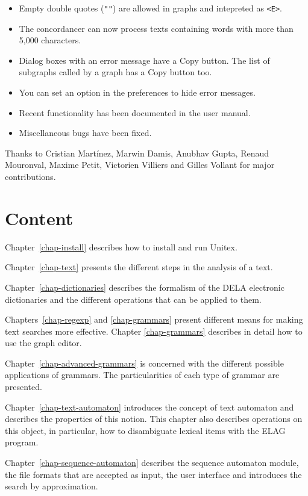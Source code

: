 \begin{itemize}
  \item Empty double quotes (\verb$""$) are allowed in graphs and intepreted
  as \verb$<E>$.
  \item The concordancer can now process texts containing words with more than
   5,000  characters.
  \item Dialog boxes with an error message have a Copy button. The list of
  subgraphs called by a graph has a Copy button too.
  \item You can set an option in the preferences to hide error messages.
  \item Recent functionality has been documented in the user manual.
  \item Miscellaneous bugs have been fixed.
\end{itemize}

\noindent Thanks to Cristian Martínez, Marwin Damis, Anubhav Gupta, Renaud Mouronval,
Maxime Petit, Victorien Villiers and Gilles Vollant for major contributions.

\section*{Content}
\noindent Chapter~\ref{chap-install} describes how to install and run
Unitex.

\bigskip \noindent Chapter~\ref{chap-text} presents the different steps in the
analysis of  a text.

\bigskip \noindent Chapter~\ref{chap-dictionaries} describes the formalism of
the DELA electronic dictionaries and the different operations that can be applied to them.

\bigskip \noindent Chapters~\ref{chap-regexp} and \ref{chap-grammars}
present different means for making text searches more effective. 
Chapter \ref{chap-grammars} describes in detail how to use the graph
editor.

\bigskip \noindent Chapter~\ref{chap-advanced-grammars} is concerned
with the different possible applications of grammars. The particularities of each type of grammar are
presented.

\bigskip \noindent Chapter~\ref{chap-text-automaton} introduces the 
concept of text automaton and describes the properties of this notion. This chapter also describes 
operations on this object, in particular, how to disambiguate lexical items with
the ELAG program.

\bigskip \noindent Chapter~\ref{chap-sequence-automaton} describes the sequence automaton module, the file formats that are accepted as input, the user interface and introduces the search by approximation.

